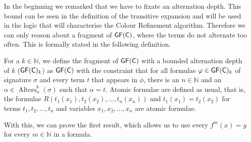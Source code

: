 In the beginning we remarked that we have to fixate an alternation depth.
This bound can be seen in the definition of the transitive expansion and will be used in the logic that will characterise the Colour Refinement algorithm.
Therefore we can only reason about a fragment of $\mathsf{GF}(\mathsf{C})$, where the terms do not alternate too often.
This is formally stated in the following definition.

\begin{definition}
	For a $k\in\mathbb N$, we define the fragment of $\mathsf{GF}(\mathsf{C})$ with a bounded alternation depth of $k$ ($\mathsf{GF}(\mathsf{C})_k$) as $\mathsf{GF}(\mathsf{C})$ with the constraint that for all formulae $\varphi\in\mathsf{GF}(\mathsf{C})_k$ of signature $\sigma$ and every term $t$ that appears in $\phi$, there is an $n\in \mathbb{N}$ and an $\alpha\in \operatorname{Alters}_n^k(\sigma)$ such that $\alpha=t$.
	Atomic formulae are defined as usual, that is, the formulae $R(t_1(x_1),t_2(x_2),\dots,t_n(x_n))$ and $t_1(x_1)=t_2(x_2)$ for terms $t_1,t_2,\dots,t_n$ and variables $x_1,x_2,\dots,x_n$ are atomic formulae.
\end{definition}

With this, we can prove the first result, which allows us to use every $f^m(x)=y$ for every $m\in \mathbb N$ in a formula.

